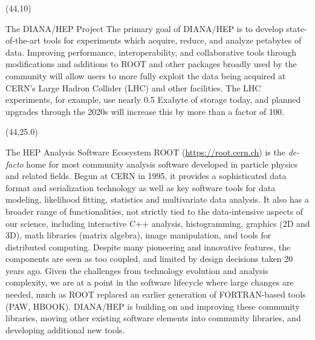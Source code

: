 \documentclass[final]{beamer}
\begin{document}
\begin{frame}{}
\begin{textblock}{38.0}(44,10)
\begin{block}{The DIANA/HEP Project}
The primary goal of DIANA/HEP is to develop state-of-the-art tools
for experiments which acquire, reduce, and analyze petabytes of
data. Improving performance, interoperability, and collaborative
tools through modifications and additions to ROOT and other packages
broadly used by the community will allow users to more fully exploit
the data being acquired at CERN's Large Hadron Collider (LHC) and
other facilities. The LHC experiments, for example, use nearly 0.5 Exabyte of
storage today, and planned upgrades through the 2020s will increase this
by more than a factor of 100. 
\end{block}
\end{textblock}






\begin{textblock}{38.0}(44,25.0)
\begin{block}{The HEP Analysis Software Ecosystem}
ROOT (\url{https://root.cern.ch}) is
the {\em de-facto} home for most community analysis
software developed in particle physics and related fields. Begun at CERN in 1995,
it provides a sophisticated data format and serialization technology
as well as key software tools for
data modeling, likelihood fitting, statistics and
multivariate data analysis. It also has a broader range of
functionalities, not strictly tied to the data-intensive aspects
of our science, including interactive C++ analysis, histogramming,
graphics (2D and 3D), math libraries (matrix algebra), image manipulation,
and tools for distributed computing. Despite many pioneering and
innovative features, the components are seen as too coupled,
and limited by design decisions taken 20 years ago.
Given the challenges from technology evolution and analysis complexity,
we are at a point in the software lifecycle where large changes are needed,
much as ROOT replaced an earlier generation of
FORTRAN-based tools (PAW, HBOOK).
DIANA/HEP is building on and improving these
community libraries, moving other existing software elements into
community libraries, and developing additional new tools.
\end{block}
\end{textblock}








\end{frame}
\end{document}
